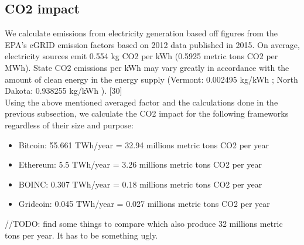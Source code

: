 \subsection{CO2 impact}

We calculate emissions from electricity generation based off figures from the EPA’s eGRID emission factors based on 2012 data published in 2015.  On average, electricity sources emit 0.554 kg CO2 per kWh (0.5925 metric tons CO2 per MWh). State CO2 emissions per kWh may vary greatly in accordance with the amount of clean energy in the energy supply (Vermont: 0.002495 kg/kWh ; North Dakota: 0.938255 kg/kWh ). [30]\\

Using the above mentioned averaged factor and the calculations done in the previous subsection, we calculate the CO2 impact for the following frameworks regardless of their size and purpose:

\begin{itemize}
  \item Bitcoin: 55.661 TWh/year = 32.94 millions metric tons CO2 per year
  \item Ethereum: 5.5 TWh/year = 3.26 millions metric tons CO2 per year
  \item BOINC: 0.307 TWh/year = 0.18 millions metric tons CO2 per year
  \item Gridcoin: 0.045 TWh/year =  0.027 millions metric tons CO2 per year
\end{itemize}

//TODO: find some things to compare which also produce 32 millions metric tons per year. It has to be something ugly.


 